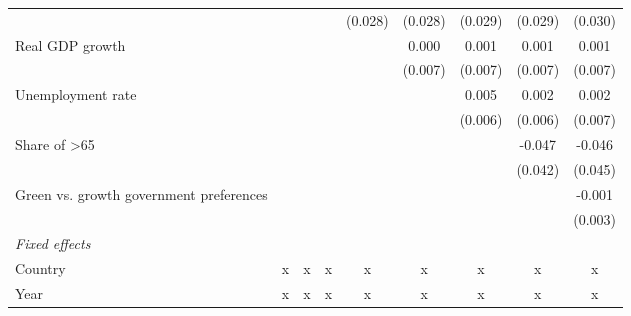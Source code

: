 \begin{table}[htbp]
\begin{tabular}{lcccccccc}
                                                                                      &         &         &                & (0.028)        & (0.028)        & (0.029)        & (0.029)        & (0.030)\\   
      Real GDP growth                                                                 &         &         &                &                & 0.000          & 0.001          & 0.001          & 0.001\\   
                                                                                      &         &         &                &                & (0.007)        & (0.007)        & (0.007)        & (0.007)\\   
      Unemployment rate                                                               &         &         &                &                &                & 0.005          & 0.002          & 0.002\\   
                                                                                      &         &         &                &                &                & (0.006)        & (0.006)        & (0.007)\\   
      Share of >65                                                                    &         &         &                &                &                &                & -0.047         & -0.046\\   
                                                                                      &         &         &                &                &                &                & (0.042)        & (0.045)\\   
      Green vs. growth government preferences                                         &         &         &                &                &                &                &                & -0.001\\   
                                                                                      &         &         &                &                &                &                &                & (0.003)\\   
      \emph{Fixed effects}\\
      Country                                                                         & x       & x       & x              & x              & x              & x              & x              & x\\  
      Year                                                                            & x       & x       & x              & x              & x              & x              & x              & x\\  

\end{tabular}
\end{table}
